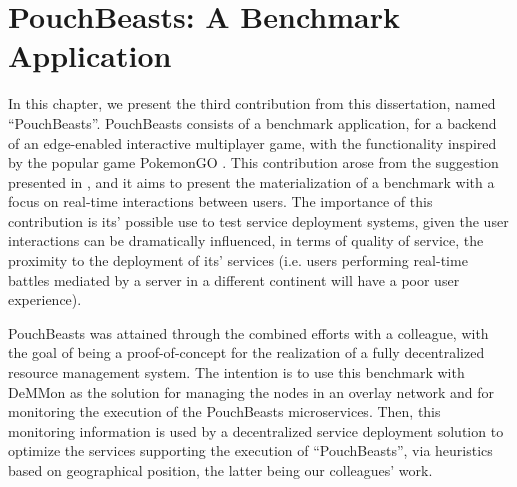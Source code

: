 

\chapter{PouchBeasts: A Benchmark Application}
\label{cha:benchmark}

In this chapter, we present the third contribution from this dissertation, named ``PouchBeasts''. PouchBeasts consists of a benchmark application, for a backend of an edge-enabled interactive multiplayer game, with the functionality inspired by the popular game PokemonGO \cite{pokemonGo}. This contribution arose from the suggestion presented in \cite{Leitao2018}, and it aims to present the materialization of a benchmark with a focus on real-time interactions between users. The importance of this contribution is its' possible use to test service deployment systems, given the user interactions can be dramatically influenced, in terms of quality of service, the proximity to the deployment of its' services (i.e. users performing real-time battles mediated by a server in a different continent will have a poor user experience).


PouchBeasts was attained through the combined efforts with a colleague, with the goal of being a proof-of-concept for the realization of a fully decentralized resource management system. The intention is to use this benchmark with DeMMon as the solution for managing the nodes in an overlay network and for monitoring the execution of the PouchBeasts microservices. Then, this monitoring information is used by a decentralized service deployment solution to optimize the services supporting the execution of ``PouchBeasts'', via heuristics based on geographical position, the latter being our colleagues' work.

